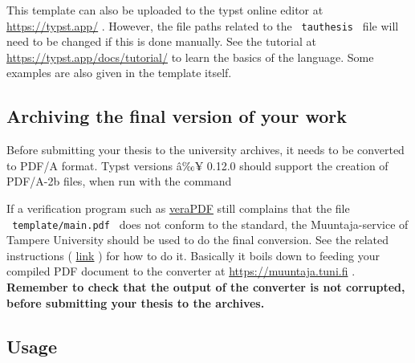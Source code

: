 This template can also be uploaded to the typst online editor at
\url{https://typst.app/} . However, the file paths related to the
\texttt{\ tauthesis\ } file will need to be changed if this is done
manually. See the tutorial at \url{https://typst.app/docs/tutorial/} to
learn the basics of the language. Some examples are also given in the
template itself.

\subsection{Archiving the final version of your
work}\label{archiving-the-final-version-of-your-work}

Before submitting your thesis to the university archives, it needs to be
converted to PDF/A format. Typst versions â‰¥ 0.12.0 should support the
creation of PDF/A-2b files, when run with the command

\begin{Shaded}
\begin{Highlighting}[]
\end{Highlighting}
\end{Shaded}

If a verification program such as
\href{https://docs.verapdf.org/install/}{veraPDF} still complains that
the file \texttt{\ template/main.pdf\ } does not conform to the
standard, the Muuntaja-service of Tampere University should be used to
do the final conversion. See the related instructions (
\href{https://libguides.tuni.fi/opinnaytteet/pdfa}{link} ) for how to do
it. Basically it boils down to feeding your compiled PDF document to the
converter at \href{https://muuntaja.tuni.fi/}{https://muuntaja.tuni.fi}
. \textbf{Remember to check that the output of the converter is not
corrupted, before submitting your thesis to the archives.}

\subsection{Usage}\label{usage}

